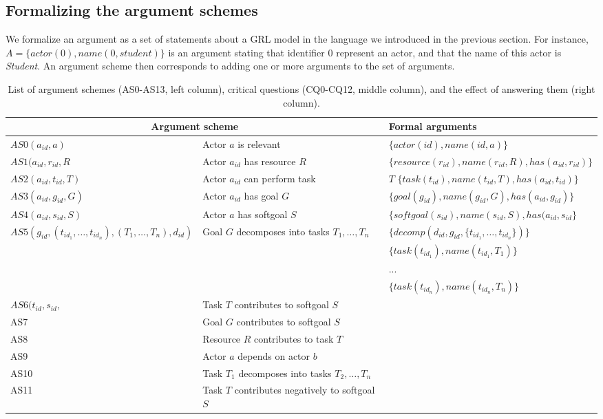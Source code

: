 \subsection{Formalizing the argument schemes}

We formalize an argument as a set of statements about a GRL model in the language we introduced in the previous section. For instance, $A= \{actor(0), name(0,student)\}$ is an argument stating that identifier 0 represent an actor, and that the name of this actor is \emph{Student}. An argument scheme then corresponds to adding one or more arguments to the set of arguments.

\begin{table*}[h]
\centering
\begin{tabularx}{\textwidth}{|l|l|l|}
\hline
\multicolumn{2}{|c|}{\textbf{Argument scheme}} & \textbf{Formal arguments}\\
\hline
$AS0(a_{id},a)$ & Actor $a$ is relevant & $\{actor(id), name(id, a)\}$\\
\hline
$AS1(a_{id},r_{id},R$ & Actor $a_{id}$ has resource $R$ & $\{resource(r_{id}), name(r_{id},R), has(a_{id},r_{id})\}$\\
\hline
$AS2(a_{id},t_{id},T)$ & Actor $a_{id}$ can perform task &$T$ $\{task(t_{id}), name(t_{id},T), has(a_{id},t_{id})\}$\\
\hline
$AS3(a_{id},g_{id},G)$ & Actor $a_{id}$ has goal $G$ &$\{goal(g_{id}), name(g_{id},G), has(a_{id},g_{id})\}$\\
\hline
$AS4(a_{id},s_{id},S)$ & Actor $a$ has softgoal $S$ & $\{softgoal(s_{id}), name(s_{id},S), has(a_{id}, s_{id}\}$\\
\hline
\hline
$AS5(g_{id},(t_{id_1},\ldots,t_{id_n}),(T_1,\ldots,T_n),d_{id})$ & Goal $G$ decomposes into tasks $T_1,\ldots,T_n$ & $\{decomp(d_{id},g_{id},\{t_{id_1},\ldots,t_{id_n}\})\}$\\
&&$\{task(t_{id_1}),name(t_{id_1},T_1)\}$\\
&&...\\
&&$\{task(t_{id_n}),name(t_{id_n},T_n)\}$\\
\hline
$AS6(t_{id},s_{id},$ & Task $T$ contributes to softgoal $S$& \\
\hline
AS7 & Goal $G$ contributes to softgoal $S$ & \\
\hline
AS8 & Resource $R$ contributes to task $T$ & \\
\hline
AS9 & Actor $a$ depends on actor $b$ & \\
\hline
AS10 & Task $T_1$ decomposes into tasks $T_2,\ldots,T_n$ & \\
\hline
AS11 & Task $T$ contributes negatively to softgoal $S$&\\
\hline
\end{tabularx}
\caption{List of argument schemes (AS0-AS13, left column), critical questions (CQ0-CQ12, middle column), and the effect of answering them (right column).}
\label{table:argument-schemes}
\end{table*}

